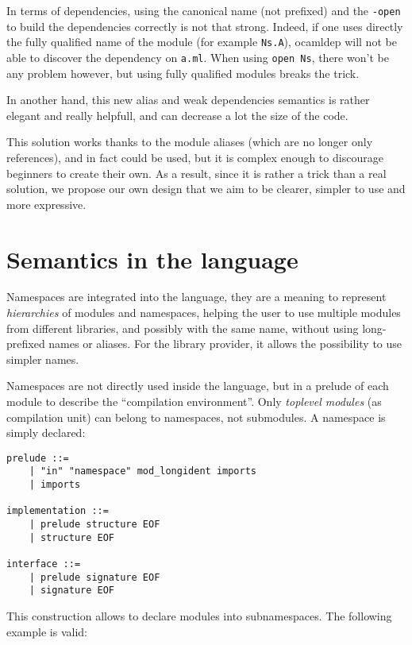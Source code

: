 \documentclass[11pt,a4paper]{article}
\begin{document}
In terms of dependencies, using the canonical name (not prefixed) and the
\texttt{-open} to build the dependencies correctly is not that strong. Indeed,
if one uses directly the fully qualified name of the module (for example
\texttt{Ns.A}), ocamldep will not be able to discover the dependency on
\texttt{a.ml}. When using \lstinline{open Ns}, there won't be any problem
however, but using fully qualified modules breaks the trick. 

In another hand, this new alias and weak dependencies semantics is rather
elegant and really helpfull, and can decrease a lot the size of the code.

This solution works thanks to the module aliases (which are no longer only
references), and in fact could be used, but it is complex enough to discourage
beginners to create their own. As a result, since it is rather a trick than a
real solution, we propose our own design that we aim to be clearer, simpler to
use and more expressive.

\section{Semantics in the language}

Namespaces are integrated into the language, they are a meaning to represent
\emph{hierarchies} of modules and namespaces, helping the user to use multiple
modules from different libraries, and possibly with the same name, without using
long-prefixed names or aliases. For the library provider, it allows the
possibility to use simpler names.

Namespaces are not directly used inside the language, but in a prelude of each
module to describe the ``compilation environment''. Only \emph{toplevel modules}
(as compilation unit) can belong to namespaces, not submodules. A namespace is
simply declared: 

\begin{verbatim}
prelude ::=
    | "in" "namespace" mod_longident imports 
    | imports

implementation ::=
    | prelude structure EOF
    | structure EOF

interface ::=
    | prelude signature EOF
    | signature EOF
\end{verbatim}

This construction allows to declare modules into subnamespaces. The following
example is valid:
\end{document}
